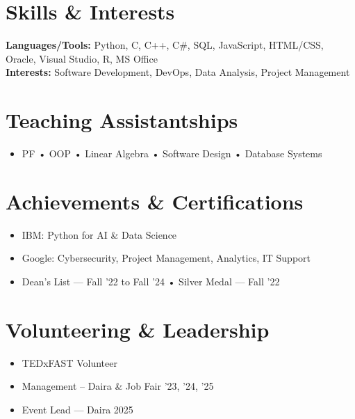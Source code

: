 \documentclass[a4paper,9.5pt]{article}
\begin{document}
\vspace{-1mm}
\section*{Skills \& Interests}
\textbf{Languages/Tools:} Python, C, C++, C\#, SQL, JavaScript, HTML/CSS, Oracle, Visual Studio, R, MS Office \\
\textbf{Interests:} Software Development, DevOps, Data Analysis, Project Management

\vspace{-1mm}
\section*{Teaching Assistantships}
\begin{itemize}
    \item PF \quad • \quad OOP \quad • \quad Linear Algebra \quad • \quad Software Design \quad • \quad Database Systems
\end{itemize}

\vspace{-1mm}
\section*{Achievements \& Certifications}
\begin{itemize}
    \item IBM: Python for AI \& Data Science
    \item Google: Cybersecurity, Project Management, Analytics, IT Support
    \item Dean’s List — Fall ’22 to Fall ’24 \quad • \quad Silver Medal — Fall ’22
\end{itemize}

\vspace{-1mm}
\section*{Volunteering \& Leadership}
\begin{itemize}
    \item TEDxFAST Volunteer
    \item Management – Daira \& Job Fair ’23, ’24, ’25
    \item Event Lead — Daira 2025
\end{itemize}
\end{document}

